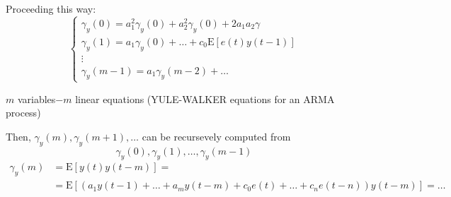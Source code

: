 Proceeding this way:
$$
\left\{\begin{array}{l}
	\gamma_{y}(0)=a_{1}^{2} \gamma_{y}(0)+a_{2}^{2} \gamma_{y}(0)+2 a_{1} a_{2} \gamma \\
	\gamma_{y}(1)=a_{1} \gamma_{y}(0)+\ldots+c_{0} \mathrm{E}[e(t) y(t-1)] \\
	\vdots \\
	\gamma_{y}(m-1)=a_{1} \gamma_{y}(m-2)+\ldots
\end{array}\right.
$$

$m$ variables$-m$ linear equations (YULE-WALKER equations for an ARMA process)

Then, $\gamma_{y}(m), \gamma_{y}(m+1), \ldots$ can be recursevely computed from
$$
\gamma_{y}(0), \gamma_{y}(1), \ldots, \gamma_{y}(m-1)
$$
\begin{align*}
	\gamma_{y}(m)&=\mathrm{E}[y(t) y(t-m)]= \\
	&=\mathrm{E}\left[\left(a_{1} y(t-1)+\ldots+a_{m} y(t-m)+c_{0} e(t)+\ldots+c_{n} e(t-n)\right) y(t-m)\right]=\ldots
\end{align*}

